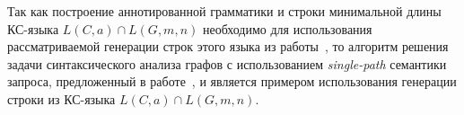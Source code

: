 Так как построение аннотированной грамматики и строки минимальной длины КС-языка $L(C,a) \cap L(G,m,n)$ необходимо для использования рассматриваемой генерации строк этого языка из работы~\cite{azimov-spbu-Okhotin}, то алгоритм решения задачи синтаксического анализа графов с использованием \textit{single-path} семантики запроса, предложенный в работе~\cite{azimov-spbu-hellings2}, и является примером использования генерации строки из КС-языка $L(C,a) \cap L(G,m,n)$.